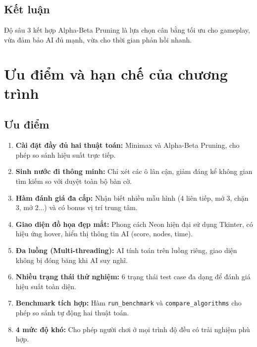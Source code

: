 \documentclass[12pt,a4paper]{article}
\begin{document}
\subsection{Kết luận}

Độ sâu 3 kết hợp Alpha-Beta Pruning là lựa chọn cân bằng tối ưu cho gameplay, vừa đảm bảo AI đủ mạnh, vừa cho thời gian phản hồi nhanh.

\section{Ưu điểm và hạn chế của chương trình}

\subsection{Ưu điểm}

\begin{enumerate}
    \item \textbf{Cài đặt đầy đủ hai thuật toán:} Minimax và Alpha-Beta Pruning, cho phép so sánh hiệu suất trực tiếp.

    \item \textbf{Sinh nước đi thông minh:} Chỉ xét các ô lân cận, giảm đáng kể không gian tìm kiếm so với duyệt toàn bộ bàn cờ.

    \item \textbf{Hàm đánh giá đa cấp:} Nhận biết nhiều mẫu hình (4 liên tiếp, mở 3, chặn 3, mở 2...) và có bonus vị trí trung tâm.

    \item \textbf{Giao diện đồ họa đẹp mắt:} Phong cách Neon hiện đại sử dụng Tkinter, có hiệu ứng hover, hiển thị thông tin AI (score, nodes, time).

    \item \textbf{Đa luồng (Multi-threading):} AI tính toán trên luồng riêng, giao diện không bị đóng băng khi AI suy nghĩ.

    \item \textbf{Nhiều trạng thái thử nghiệm:} 6 trạng thái test case đa dạng để đánh giá hiệu suất toàn diện.

    \item \textbf{Benchmark tích hợp:} Hàm \texttt{run\_benchmark} và \texttt{compare\_algorithms} cho phép so sánh tự động hai thuật toán.

    \item \textbf{4 mức độ khó:} Cho phép người chơi ở mọi trình độ đều có trải nghiệm phù hợp.
\end{enumerate}
\end{document}
